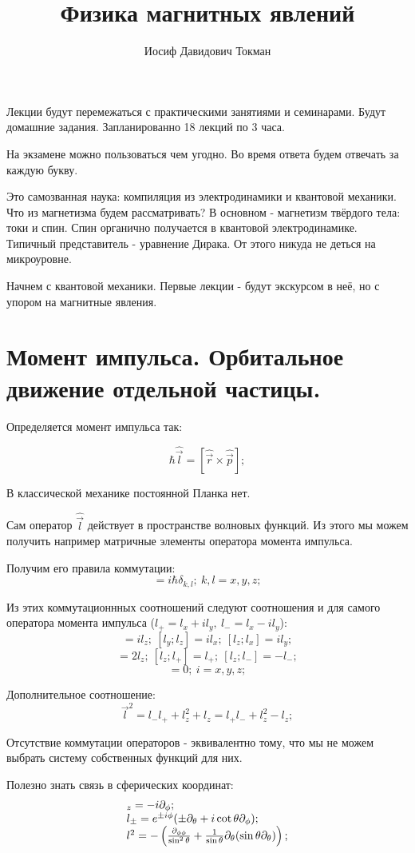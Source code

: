 \documentclass[a4paper, 14pt, russian]{article}
\title{Физика магнитных явлений}
\author{Иосиф Давидович Токман}
\date{}
\newcommand{\be}{\begin{equation}}
\newcommand{\ee}{\end{equation}}
\newcommand{\bea}{\begin{equation}\begin{array}}
\newcommand{\eea}{\end{array}\end{equation}}
\newcommand{\pa}{\partial}
\begin{document}
	\maketitle

	Лекции будут перемежаться с практическими занятиями и семинарами. 
	Будут домашние задания. Запланированно 18 лекций по 3 часа.

	На экзамене можно пользоваться чем угодно. Во время ответа будем 
	отвечать за каждую букву.

	Это самозванная наука: компиляция из электродинамики и квантовой механики.
	Что из магнетизма будем рассматривать? В основном - магнетизм твёрдого тела: 
	токи и спин. Спин органично получается в квантовой электродинамике. Типичный 
	представитель - уравнение Дирака. От этого никуда не деться на микроуровне.

	Начнем с квантовой механики. Первые лекции - будут экскурсом в неё, но с упором
	на магнитные явления.

	\section{Момент импульса. Орбитальное движение отдельной частицы.}

	Определяется момент импульса так:

	\be
		\hbar \hat{\vec l} = [\hat{\vec r} \times \hat{\vec p}];
	\ee

	В классической механике постоянной Планка нет. 

	Сам оператор $\hat{\vec l}$ действует в пространстве волновых функций.
	Из этого мы можем получить например матричные элементы оператора момента 
	импульса.

	Получим его правила коммутации:
	\be
		[\hat{r}_k;\hat{p}_l] = i \hbar \delta_{k,l};~k,l = x,y,z;
	\ee

	Из этих коммутационнных соотношений следуют соотношения и для самого оператора
	момента импульса ($l_{+} = l_x + i l_y,~l_{-} = l_x - i l_y$):
	\be
		[l_x; l_y] = i l_z;~[l_y; l_z] = i l_x;~[l_z; l_x] = i l_y;
	\ee
	\be
		[l_{+}; l_{-}] = 2l_z;~[l_z;l_{+}]= l_{+};~[l_z;l_{-}] = -l_{-};
	\ee
	\be
		[{\vec l}^2; l_i] = 0;~i=x,y,z;
	\ee

	Дополнительное соотношение:
	\be
		{\vec l}^2 = l_{-}l_{+} + l_z^2 + l_z = l_{+}l_{-} + l_z^2 - l_z;
	\ee

	Отсутствие коммутации операторов - эквивалентно тому, что мы не можем выбрать 
	систему собственных функций для них.

	Полезно знать связь в сферических координат:
	\bea
		l_z = - i \pa_\phi;\\
		l_\pm = e^{\pm i \phi} (\pm \pa_\theta + i \cot \theta \pa_\phi);\\
		l^2 = - \left(\frac{\pa_{\phi \phi}}{\sin^2 \theta} + 
			\frac{1}{\sin \theta} \pa_\theta (\sin\theta \pa_\theta)\right);
	\eea
\end{document}

